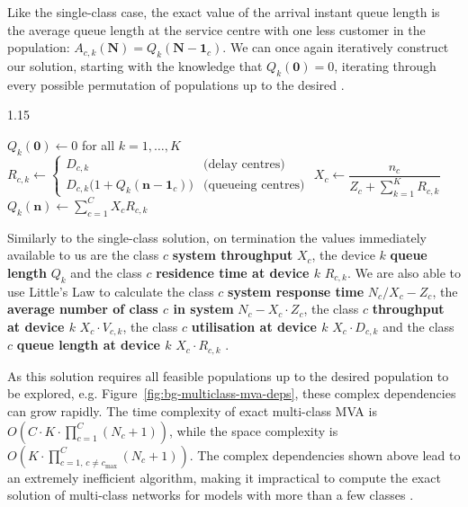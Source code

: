 Like the single-class case, the exact value of the arrival instant queue length is the average queue length at the service centre with one less customer in the population: $A_{c,k}(\mathbf{N}) = Q_k(\mathbf{N} - \mathbf{1}_c)$. We can once again iteratively construct our solution, starting with the knowledge that $Q_k(\mathbf{0}) = 0$, iterating through every possible permutation of populations up to the desired \cite{lazowska84,reiser80}.

\begin{algorithm}
\caption{Exact MVA for multi-class models \cite{lazowska84}}
\begin{spacing}{1.15}
\begin{algorithmic}[1]
\State $Q_k(\mathbf{0}) \gets 0$ for all $k = 1,\ldots,K$
        \State $R_{c,k} \gets \begin{cases}D_{c,k} & \text{(delay centres)} \\ D_{c,k} \bigl(1 + Q_k(\mathbf{n} - \mathbf{1}_c)\bigr) & \text{(queueing centres)}\end{cases}$
      \EndFor
    \EndFor
      \State $X_c \gets \dfrac{n_c}{Z_c + \sum_{k=1}^{K} R_{c,k}}$
    \EndFor
      \State $Q_k(\mathbf{n}) \gets \sum_{c=1}^{C} X_c R_{c,k}$
    \EndFor
  \EndFor
\EndFor
\end{algorithmic}
\end{spacing}
\end{algorithm}

Similarly to the single-class solution, on termination the values immediately available to us are the class $c$ \textbf{system throughput} $X_c$, the device $k$ \textbf{queue length} $Q_k$ and the class $c$ \textbf{residence time at device $k$} $R_{c,k}$. We are also able to use Little's Law to calculate the class $c$ \textbf{system response time} $N_c/X_c - Z_c$, the \textbf{average number of class $c$ in system} $N_c - X_c \cdot Z_c$, the class $c$ \textbf{throughput at device $k$} $X_c \cdot V_{c,k}$, the class $c$ \textbf{utilisation at device $k$} $X_c \cdot D_{c,k}$ and the class $c$ \textbf{queue length at device $k$} $X_c \cdot R_{c,k}$ \cite{lazowska84}.

As this solution requires all feasible populations up to the desired population to be explored, e.g. Figure~\ref{fig:bg-multiclass-mva-deps}, these complex dependencies can grow rapidly. The time complexity of exact multi-class MVA is $O\!\left(C \cdot K \cdot \prod_{c=1}^{C} (N_c + 1)\right)$, while the space complexity is $O\!\left(K \cdot \prod_{c=1,\, c \neq c_{\max}}^{C} (N_c + 1)\right)$. The complex dependencies shown above lead to an extremely inefficient algorithm, making it impractical to compute the exact solution of multi-class networks for models with more than a few classes \cite{lazowska84,reiser80}.

